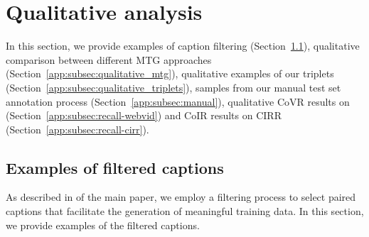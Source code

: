 \begin{table} \setlength\tabcolsep{5pt}
    \caption{\textbf{Variants of pretrained BLIP backbones:} 
    We compare the BLIP model without finetuning (base), BLIP finetuned on Flickr30k, and BLIP finetuned on COCO (the one used in the rest of the paper)~\cite{BLIP}.
    For this experiment, we finetune the models on \ourDS using the cross-attention layers of
    BLIP as the fusion method, and 15 frames for the target video as in the last row
    of 
    \if{} \fi
    }
    \centering
\label{tab:pretrained-blip-models}
\end{table} 


\section{Qualitative analysis}
\label{app:sec:qualitative-examples}
In this section, we provide
examples of caption filtering (Section~\ref{app:subsec:qualitative_filtering}),
qualitative comparison between different MTG approaches (Section~\ref{app:subsec:qualitative_mtg}),
qualitative examples of our \ourDS triplets (Section~\ref{app:subsec:qualitative_triplets}),
samples from our manual test set annotation process (Section~\ref{app:subsec:manual}),
qualitative CoVR results on \ourDSm (Section~\ref{app:subsec:recall-webvid})
and CoIR results on CIRR (Section~\ref{app:subsec:recall-cirr}).

\subsection{Examples of filtered captions}
\label{app:subsec:qualitative_filtering}
As described in 
\if{} \fi
of the main paper,
we employ a filtering process to select paired captions 
that facilitate the generation of meaningful training data.
In this section, we provide examples of the filtered captions.

